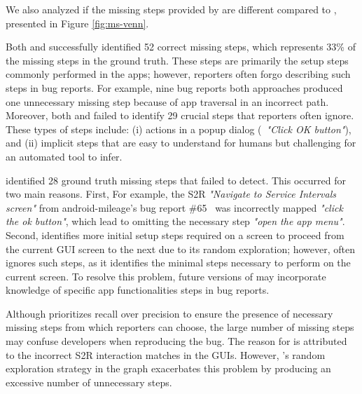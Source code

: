 We also analyzed if the missing steps provided by \tool are different compared to \EulerC, presented in Figure \ref{fig:ms-venn}. 

Both \EulerC and \tool successfully identified 52 correct missing steps, which represents 33\% of the missing steps in the ground truth. These steps are primarily the setup steps commonly performed in the apps; however, reporters often forgo describing such steps in bug reports. For example, nine bug reports   both approaches produced one unnecessary missing step because of app traversal in an incorrect path. Moreover, both \tool and \EulerC failed to identify 29 crucial steps that reporters often ignore. These types of steps include: (i) actions in a popup dialog (\eg\ \textit{"Click OK button"}), and (ii) implicit steps that are easy to understand for humans but challenging for an automated tool to infer. 

\EulerC identified 28 ground truth missing steps that \tool failed to detect. This occurred for two main reasons. First, \tool {} For example, the S2R \textit{"Navigate to Service Intervals screen"} from android-mileage's bug report \#65~\cite{mileage65} was incorrectly mapped  \textit{"click the ok button"}, which lead to omitting the necessary step \textit{"open the app menu"}. Second, \EulerC identifies more initial setup steps required on a screen to proceed from the current GUI screen to the next due to its random exploration; however, \tool often ignores such steps, as it identifies the minimal steps necessary to perform on the current screen. To resolve this problem, future versions of \tool may incorporate knowledge of specific app functionalities  steps in bug reports. 

Although \EulerC prioritizes recall over precision to ensure the presence of necessary missing steps from which reporters can choose, the large number of missing steps may confuse developers when reproducing the bug.
The reason for  is attributed to the incorrect S2R interaction matches in the GUIs. However, \EulerC's random exploration strategy in the graph exacerbates this problem by producing an excessive number of unnecessary steps.

